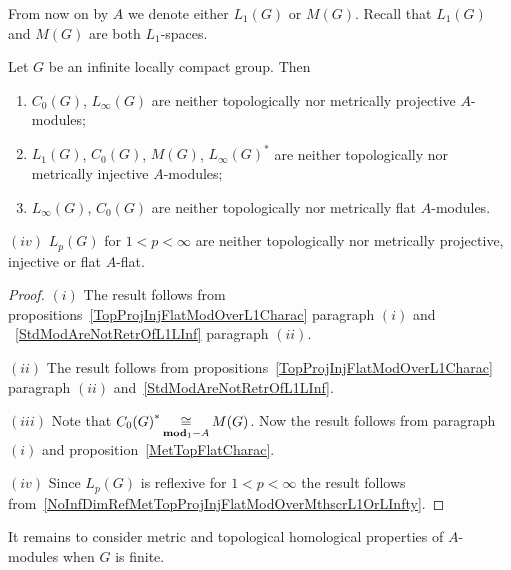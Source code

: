 From now on by $A$ we denote either $L_1(G)$ or $M(G)$. Recall that $L_1(G)$ and
$M(G)$ are both $L_1$-spaces.

\begin{proposition}\label{StdModAreNotL1MGMetTopProjInjFlat} Let $G$ be an
infinite locally compact group. Then

\begin{enumerate}[label = (\roman*)]
    \item $C_0(G)$, $L_\infty(G)$ are neither topologically nor metrically 
    projective $A$-modules;

    \item $L_1(G)$, $C_0(G)$, $M(G)$, ${L_\infty(G)}^*$ are neither 
    topologically nor metrically injective $A$-modules;

    \item $L_\infty(G)$, $C_0(G)$ are neither topologically nor metrically flat
    $A$-modules.
\end{enumerate}
\end{proposition}

$(iv)$ $L_p(G)$ for $1<p<\infty$ are neither topologically nor metrically
projective, injective or flat $A$-flat.

\begin{proof} $(i)$ The result follows from
propositions~\ref{TopProjInjFlatModOverL1Charac} paragraph $(i)$ and
~\ref{StdModAreNotRetrOfL1LInf} paragraph $(ii)$.

$(ii)$ The result follows from propositions~\ref{TopProjInjFlatModOverL1Charac}
paragraph $(ii)$ and~\ref{StdModAreNotRetrOfL1LInf}.

$(iii)$ Note that ${C_0(G)}^*\mathop{\mathbin{\cong}}\limits_{\mathbf{mod}_1-A}M(G)$. Now the result 
follows from paragraph $(i)$ and proposition~\ref{MetTopFlatCharac}.

$(iv)$ Since $L_p(G)$ is reflexive for $1<p<\infty$ the result follows
from~\ref{NoInfDimRefMetTopProjInjFlatModOverMthscrL1OrLInfty}.
\end{proof}

It remains to consider metric and topological homological properties of
$A$-modules when $G$ is finite.

